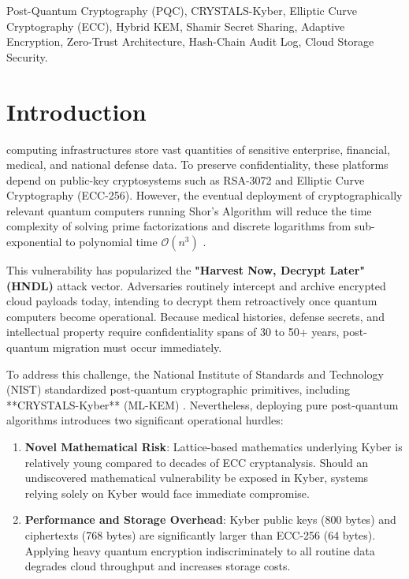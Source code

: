 \documentclass[journal,twoside]{IEEEtran}
\begin{document}
\begin{IEEEkeywords}
Post-Quantum Cryptography (PQC), CRYSTALS-Kyber, Elliptic Curve Cryptography (ECC), Hybrid KEM, Shamir Secret Sharing, Adaptive Encryption, Zero-Trust Architecture, Hash-Chain Audit Log, Cloud Storage Security.
\end{IEEEkeywords}

\section{Introduction}
 computing infrastructures store vast quantities of sensitive enterprise, financial, medical, and national defense data. To preserve confidentiality, these platforms depend on public-key cryptosystems such as RSA-3072 and Elliptic Curve Cryptography (ECC-256). However, the eventual deployment of cryptographically relevant quantum computers running Shor's Algorithm will reduce the time complexity of solving prime factorizations and discrete logarithms from sub-exponential to polynomial time $\mathcal{O}(n^3)$ \cite{shor1994}.

This vulnerability has popularized the \textbf{"Harvest Now, Decrypt Later" (HNDL)} attack vector. Adversaries routinely intercept and archive encrypted cloud payloads today, intending to decrypt them retroactively once quantum computers become operational. Because medical histories, defense secrets, and intellectual property require confidentiality spans of 30 to 50+ years, post-quantum migration must occur immediately.

To address this challenge, the National Institute of Standards and Technology (NIST) standardized post-quantum cryptographic primitives, including **CRYSTALS-Kyber** (ML-KEM) \cite{bos2018kyber}. Nevertheless, deploying pure post-quantum algorithms introduces two significant operational hurdles:
\begin{enumerate}
    \item \textbf{Novel Mathematical Risk}: Lattice-based mathematics underlying Kyber is relatively young compared to decades of ECC cryptanalysis. Should an undiscovered mathematical vulnerability be exposed in Kyber, systems relying solely on Kyber would face immediate compromise.
    \item \textbf{Performance and Storage Overhead}: Kyber public keys (800 bytes) and ciphertexts (768 bytes) are significantly larger than ECC-256 (64 bytes). Applying heavy quantum encryption indiscriminately to all routine data degrades cloud throughput and increases storage costs.
\end{enumerate}
\end{document}
